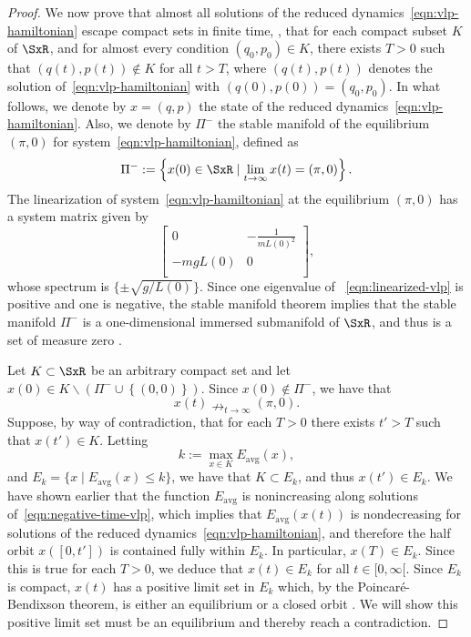 \begin{proof}
We now prove that almost all solutions of the reduced
dynamics~\eqref{eqn:vlp-hamiltonian} escape compact sets in finite
time, \ie, that for each compact subset \(K\) of 
\(\SxR\), and for almost every condition 
\( (q_0,p_0) \in K \), there exists \( T > 0\) such that
\( (q(t),p(t)) \notin K \) for all \( t > T \), where \( (q(t),p(t)) \)
denotes the solution of~\eqref{eqn:vlp-hamiltonian} with 
\( (q(0),p(0)) = (q_0,p_0)\). 
In what follows, we denote by \( x = (q,p) \) the state of the reduced
dynamics~\eqref{eqn:vlp-hamiltonian}. 
Also, we denote by \(\Pi^-\) the stable manifold of the equilibrium \((\pi,0)\)
for system~\eqref{eqn:vlp-hamiltonian}, defined as
\[
   \Pi^- := \left\{ x(0) \in \SxR \mid
   \lim_{t \to \infty} x(t) = (\pi, 0) \right\}.
\]
The linearization of system~\eqref{eqn:vlp-hamiltonian} at the
equilibrium \((\pi,0)\) has a system matrix given by
\begin{equation}\label{eqn:linearized-vlp}
   \begin{bmatrix}
      0 & -\frac{1}{mL(0)^2} \\
      -m g L(0) & 0 \\
   \end{bmatrix}
   ,
\end{equation}
whose spectrum is \(\{\pm \sqrt{{g}/{L(0)}}\}\).  
Since one eigenvalue of ~\eqref{eqn:linearized-vlp} is positive and one is
negative, the stable manifold theorem implies that the stable manifold 
\( \Pi^- \) is a one-dimensional immersed submanifold of
\(\SxR\), and thus is a set of measure zero
\cite{stable_manifold}.

Let \( K \subset \SxR\) be an arbitrary compact set and let 
\( x(0) \in K \backslash \left(\Pi^- \cup \left\{(0,0)\right\}\right)\).
Since \( x(0) \notin \Pi^- \), we have that
\begin{equation}\label{eqn:vlp-x-does-not-converge}
   x(t) \nrightarrow_{t \to \infty} (\pi,0).
\end{equation}
Suppose, by way of contradiction, that for each \(T > 0\) there exists 
\(t' > T\) such that \(x(t') \in K\).  
Letting
\[
   k := \max\limits_{x \in K} E_\text{avg}(x)
   ,
\] 
and \(E_k =\{ x \mid E_\text{avg}(x) \leq k\} \), we have that 
\( K \subset E_k \), and thus \(x(t') \in E_k\).
We have shown earlier that the function \( E_\text{avg} \) is nonincreasing
along solutions of~\eqref{eqn:negative-time-vlp}, which implies that
\( E_\text{avg}(x(t)) \) is nondecreasing for solutions of the reduced
dynamics~\eqref{eqn:vlp-hamiltonian}, and therefore the half orbit \(x([0,t'])\)
is contained fully within \(E_k\).  
In particular, \(x(T) \in E_k\). Since this is true for each \( T >0 \), we
deduce that \(x(t) \in E_k\) for all \(t \in [0,\infty[\).  
Since \(E_k\) is compact, \(x(t)\) has a positive limit set in \(E_k\) which, by
the Poincar\'{e}-Bendixson theorem, is either an equilibrium or a closed orbit
\cite{poincare_bendixson}.  
We will show this positive limit set must be an equilibrium and thereby reach a
contradiction.


\end{proof}
